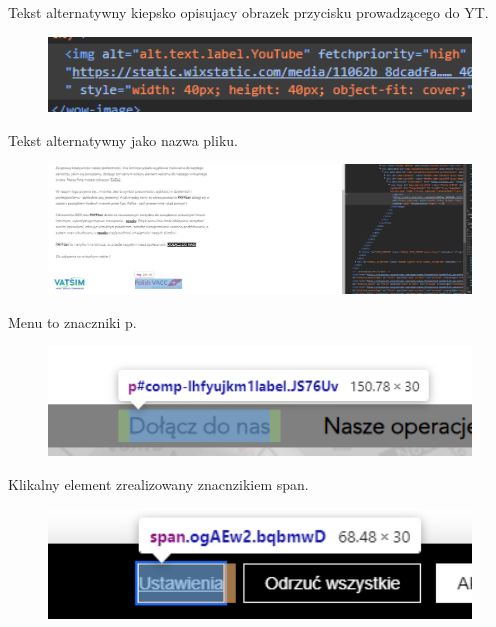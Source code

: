 \documentclass[12pt,oneside,a4paper]{book} %
\theoremstyle{break}
\begin{document}
Tekst alternatywny kiepsko opisujacy obrazek przycisku prowadzącego do YT.

\begin{figure}[H]
  \centering
  \includegraphics[width=1\textwidth]{paffsair/not-meaningfull-alt.png}
\end{figure}

Tekst alternatywny jako nazwa pliku.

\begin{figure}[H]
  \centering
  \includegraphics[width=1\textwidth]{paffsair/alt-text-as-filename.png}
\end{figure}
\newpage
Menu to znaczniki p.
\begin{figure}[H]
  \centering
  \includegraphics[width=1\textwidth]{paffsair/link-as-p.png}
\end{figure}

Klikalny element zrealizowany znacnzikiem span.
\begin{figure}[H]
  \centering
  \includegraphics[width=1\textwidth]{paffsair/clickable-span.png}
\end{figure}
\end{document}
